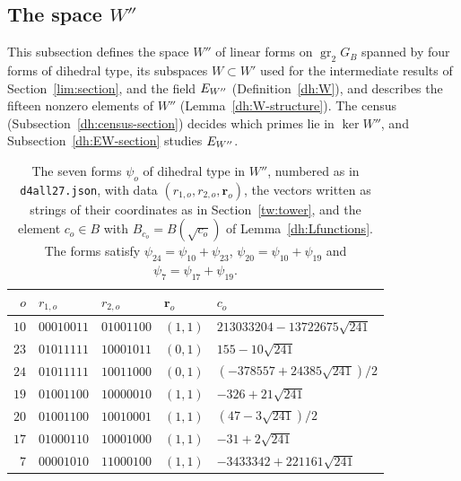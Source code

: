 \subsection{\texorpdfstring{The space $W''$}{The space W''}}\label{dh:W-section}
This subsection defines the space $W''$ of linear forms on
$\operatorname{gr}_2G_B$ spanned by four forms of dihedral type, its
subspaces $W\subset W'$ used for the intermediate results of
Section~\ref{lim:section}, and the field $E_{W''}$ (Definition~\ref{dh:W}), and
describes the fifteen nonzero elements of $W''$
(Lemma~\ref{dh:W-structure}). The census (Subsection~\ref{dh:census-section})
decides which primes lie in $\ker W''$, and
Subsection~\ref{dh:EW-section} studies $E_{W''}$.

\begin{table}[htbp]
\centering\small
\caption{The seven forms $\psi_o$ of dihedral type in $W''$, numbered as in
\texttt{d4all27.json}, with data $(r_{1,o},r_{2,o},\mathbf r_o)$, the vectors
written as strings of their coordinates as in Section~\ref{tw:tower}, and the
element $c_o\in B$ with $B_{c_o}=B(\sqrt{c_o})$ of Lemma~\ref{dh:Lfunctions}.
The forms satisfy $\psi_{24}=\psi_{10}+\psi_{23}$,
$\psi_{20}=\psi_{10}+\psi_{19}$ and $\psi_7=\psi_{17}+\psi_{19}$.}
\label{dh:W-table}
\begin{tabular}{rllll}
\toprule
$o$ & $r_{1,o}$ & $r_{2,o}$ & $\mathbf r_o$ & $c_o$\\
\midrule
$10$ & $00010011$ & $01001100$ & $(1,1)$ & $213033204-13722675\sqrt{241}$\\
$23$ & $01011111$ & $10001011$ & $(0,1)$ & $155-10\sqrt{241}$\\
$24$ & $01011111$ & $10011000$ & $(0,1)$ & $(-378557+24385\sqrt{241})/2$\\
$19$ & $01001100$ & $10000010$ & $(1,1)$ & $-326+21\sqrt{241}$\\
$20$ & $01001100$ & $10010001$ & $(1,1)$ & $(47-3\sqrt{241})/2$\\
$17$ & $01000110$ & $10001000$ & $(1,1)$ & $-31+2\sqrt{241}$\\
$7$ & $00001010$ & $11000100$ & $(1,1)$ & $-3433342+221161\sqrt{241}$\\
\bottomrule
\end{tabular}
\end{table}

